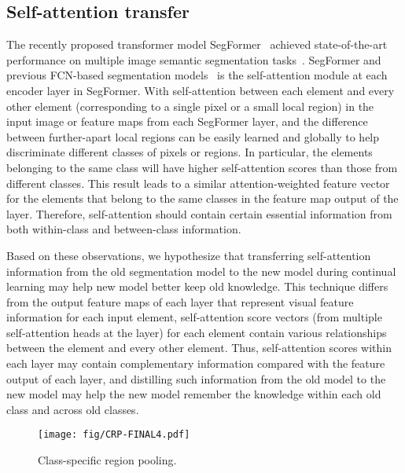 \documentclass[onecolumn,conference,compsoc]{IEEEtran}
\begin{document}
\begin{spacing}{1.5}
\begin{figure*}[tp]
\end{figure*}

\subsection{Self-attention transfer}

The recently proposed transformer model SegFormer~\cite{SegFormer} achieved state-of-the-art performance on multiple image semantic segmentation tasks~\cite{VOC, ADE20K}. SegFormer and previous FCN-based segmentation models~\cite{UNet,DeeplabV2, DeeplabV3, DeeplabV3+} is the self-attention module at each encoder layer in SegFormer. With self-attention between each element and every other element (corresponding to a single pixel or a small local region) in the input image or feature maps from each SegFormer layer, and the difference between further-apart local regions can be easily learned and globally to help discriminate different classes of pixels or regions. In particular, the elements belonging to the same class will have higher self-attention scores than those from different classes. This  {result leads} to a similar attention-weighted feature vector for the elements that belong to the same classes in the feature map output of the layer. Therefore, self-attention should contain certain essential  {information from} both within-class and between-class information.

Based on  {these observations, we hypothesize} that transferring self-attention information from the old segmentation model to the new model during continual learning may help new model better keep old knowledge.  {This technique differs} from the output feature maps of each layer that represent visual feature information for each input element, self-attention score vectors (from multiple self-attention heads at the layer) for each element contain various relationships between the element and every other element. Thus, self-attention scores within each layer may contain complementary information compared  {with} the feature output of each layer, and distilling such information from the old model to the new model may help the new model remember the knowledge within each old class and across old classes.

\begin{figure}[tbp]
    \centering
    \texttt{[image: fig/CRP-FINAL4.pdf]}
    \caption{\normalsize Class-specific region pooling.}
    \label{fig:CRP}
\end{figure}




\end{spacing}
\end{document}
